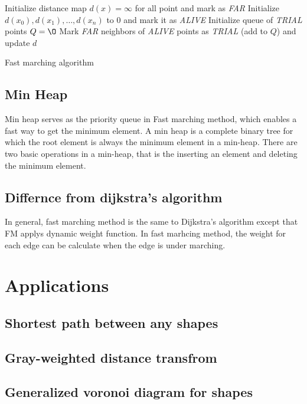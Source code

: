 \begin{algorithm}[H]
\label{alg:fast-marching}
\SetAlgoLined
{}
Initialize distance map $d(x) = \infty$ for all point and mark as \emph{FAR} \;
Initialize $d(x_0),d(x_1),\ldots,d(x_n)$ to $0$ and mark it as \emph{ALIVE} \;
Initialize queue of \emph{TRIAL} points $Q = \O$ \;
Mark \emph{FAR} neighbors of \emph{ALIVE} points as \emph{TRIAL} (add to $Q$) and update $d$ \;
\caption{Fast marching algorithm}
\end{algorithm}
\subsection{Min Heap}
Min heap serves as the priority queue in Fast marching method, which enables a fast way to get the minimum element. A min heap is a complete binary tree for which the root element is always the minimum element in a min-heap. There are two basic operations in a min-heap, that is the inserting an element and deleting the minimum element.

\subsection{Differnce from dijkstra's algorithm}
In general, fast marching method is the same to Dijkstra's algorithm except that FM applys dynamic weight function. In fast marhcing method, the weight for each edge can be calculate when the edge is under marching.
\section{Applications}
\subsection{Shortest path between any shapes}
\subsection{Gray-weighted distance transfrom}
\subsection{Generalized voronoi diagram for shapes} \label{subsec:gvd}

